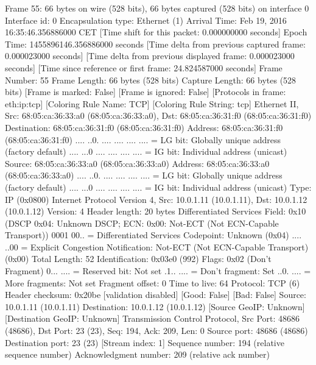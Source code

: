 Frame 55: 66 bytes on wire (528 bits), 66 bytes captured (528 bits) on interface 0
    Interface id: 0
    Encapsulation type: Ethernet (1)
    Arrival Time: Feb 19, 2016 16:35:46.356886000 CET
    [Time shift for this packet: 0.000000000 seconds]
    Epoch Time: 1455896146.356886000 seconds
    [Time delta from previous captured frame: 0.000023000 seconds]
    [Time delta from previous displayed frame: 0.000023000 seconds]
    [Time since reference or first frame: 24.824587000 seconds]
    Frame Number: 55
    Frame Length: 66 bytes (528 bits)
    Capture Length: 66 bytes (528 bits)
    [Frame is marked: False]
    [Frame is ignored: False]
    [Protocols in frame: eth:ip:tcp]
    [Coloring Rule Name: TCP]
    [Coloring Rule String: tcp]
Ethernet II, Src: 68:05:ca:36:33:a0 (68:05:ca:36:33:a0), Dst: 68:05:ca:36:31:f0 (68:05:ca:36:31:f0)
    Destination: 68:05:ca:36:31:f0 (68:05:ca:36:31:f0)
        Address: 68:05:ca:36:31:f0 (68:05:ca:36:31:f0)
        .... ..0. .... .... .... .... = LG bit: Globally unique address (factory default)
        .... ...0 .... .... .... .... = IG bit: Individual address (unicast)
    Source: 68:05:ca:36:33:a0 (68:05:ca:36:33:a0)
        Address: 68:05:ca:36:33:a0 (68:05:ca:36:33:a0)
        .... ..0. .... .... .... .... = LG bit: Globally unique address (factory default)
        .... ...0 .... .... .... .... = IG bit: Individual address (unicast)
    Type: IP (0x0800)
Internet Protocol Version 4, Src: 10.0.1.11 (10.0.1.11), Dst: 10.0.1.12 (10.0.1.12)
    Version: 4
    Header length: 20 bytes
    Differentiated Services Field: 0x10 (DSCP 0x04: Unknown DSCP; ECN: 0x00: Not-ECT (Not ECN-Capable Transport))
        0001 00.. = Differentiated Services Codepoint: Unknown (0x04)
        .... ..00 = Explicit Congestion Notification: Not-ECT (Not ECN-Capable Transport) (0x00)
    Total Length: 52
    Identification: 0x03e0 (992)
    Flags: 0x02 (Don't Fragment)
        0... .... = Reserved bit: Not set
        .1.. .... = Don't fragment: Set
        ..0. .... = More fragments: Not set
    Fragment offset: 0
    Time to live: 64
    Protocol: TCP (6)
    Header checksum: 0x20be [validation disabled]
        [Good: False]
        [Bad: False]
    Source: 10.0.1.11 (10.0.1.11)
    Destination: 10.0.1.12 (10.0.1.12)
    [Source GeoIP: Unknown]
    [Destination GeoIP: Unknown]
Transmission Control Protocol, Src Port: 48686 (48686), Dst Port: 23 (23), Seq: 194, Ack: 209, Len: 0
    Source port: 48686 (48686)
    Destination port: 23 (23)
    [Stream index: 1]
    Sequence number: 194    (relative sequence number)
    Acknowledgment number: 209    (relative ack number)
